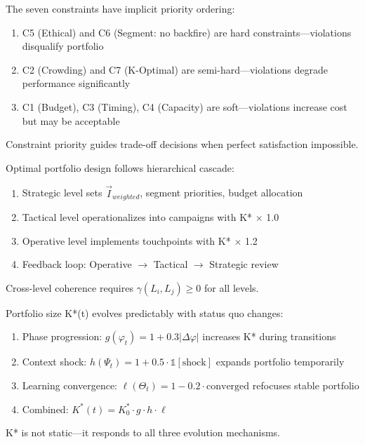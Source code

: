 \begin{theorem}
The seven constraints have implicit priority ordering:
\begin{enumerate}
\item C5 (Ethical) and C6 (Segment: no backfire) are hard constraints---violations disqualify portfolio
\item C2 (Crowding) and C7 (K-Optimal) are semi-hard---violations degrade performance significantly
\item C1 (Budget), C3 (Timing), C4 (Capacity) are soft---violations increase cost but may be acceptable
\end{enumerate}
Constraint priority guides trade-off decisions when perfect satisfaction impossible.
\end{theorem}

\begin{theorem}
Optimal portfolio design follows hierarchical cascade:
\begin{enumerate}
\item Strategic level sets $\vec{I}_{weighted}$, segment priorities, budget allocation
\item Tactical level operationalizes into campaigns with K* $\times$ 1.0
\item Operative level implements touchpoints with K* $\times$ 1.2
\item Feedback loop: Operative $\to$ Tactical $\to$ Strategic review
\end{enumerate}
Cross-level coherence requires $\gamma(L_i, L_j) \geq 0$ for all levels.
\end{theorem}

\begin{theorem}
Portfolio size K*(t) evolves predictably with status quo changes:
\begin{enumerate}
\item Phase progression: $g(\varphi_t) = 1 + 0.3|\Delta\varphi|$ increases K* during transitions
\item Context shock: $h(\Psi_t) = 1 + 0.5 \cdot \mathbb{1}[\text{shock}]$ expands portfolio temporarily
\item Learning convergence: $\ell(\Theta_t) = 1 - 0.2 \cdot \text{converged}$ refocuses stable portfolio
\item Combined: $K^*(t) = K^*_0 \cdot g \cdot h \cdot \ell$
\end{enumerate}
K* is not static---it responds to all three evolution mechanisms.
\end{theorem}

